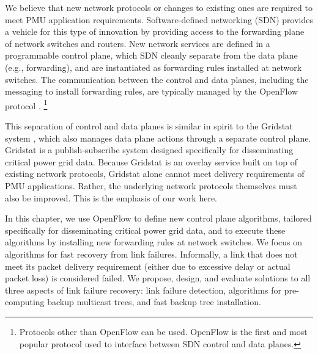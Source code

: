 We believe that new network protocols or changes to existing ones are required to meet PMU application requirements. Software-defined networking (SDN) provides a vehicle for this type of innovation 
by providing access to the forwarding plane of network switches and routers. %
New network services are defined in a programmable control plane, which SDN cleanly separate from the data plane (e.g., forwarding), and are instantiated as forwarding rules installed
at network switches.  %
The communication between the control and data planes, including the messaging to install forwarding rules, are typically managed by the OpenFlow protocol \cite{OpenFlow08}.
\footnote{Protocols other than OpenFlow can be used.  OpenFlow is the first and most popular protocol used to interface between SDN control and data planes.  }

This separation of control and data planes is similar in spirit to the Gridstat system \cite{Bakken11}, which also manages data plane actions through a separate control plane. 
Gridstat \cite{Bakken11} is a publish-subscribe system designed specifically for disseminating critical power grid data. 
Because Gridstat is an overlay service built on top of existing network protocols, Gridstat alone cannot meet delivery requirements of PMU applications. 
Rather, the underlying network protocols themselves must also be improved. %
This is the emphasis of our work here. 

In this chapter, we use OpenFlow to define new control plane algorithms, tailored specifically for disseminating critical power grid data, and to execute these algorithms by installing
new forwarding rules at network switches.
We focus on algorithms for fast recovery from link failures.
Informally, a link that does not meet its packet delivery requirement (either due to excessive delay or actual packet loss) is considered failed. 
We propose, design, and evaluate solutions to all three aspects of link failure recovery: link failure detection, algorithms for pre-computing backup multicast trees, 
and fast backup tree installation. 





